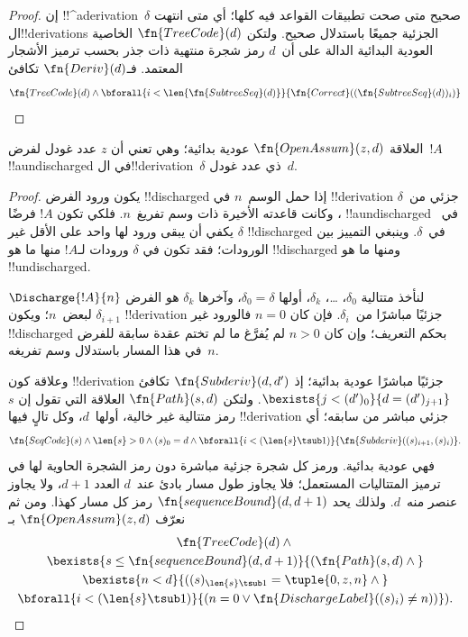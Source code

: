 \documentclass[../../../include/open-logic-section]{subfiles}
\begin{document}
\begin{proof}
  إن !!^a{derivation}~$\delta$ صحيح متى صحت
  تطبيقات القواعد فيه كلها؛ أي متى انتهت
  ال!!{derivation}s الجزئية جميعًا باستدلال
  صحيح. ولتكن $\fn{TreeCode}(d)$ الخاصية العودية البدائية الدالة
  على أن~$d$ رمز شجرة منتهية ذات جذر بحسب ترميز الأشجار المعتمد.
  فـ$\fn{Deriv}(d)$ تكافئ
  \[
  \fn{TreeCode}(d) \land
  \bforall{i<\len{\fn{SubtreeSeq}(d)}}{\fn{Correct}((\fn{SubtreeSeq}(d))_i)}
  \]
\end{proof}

\begin{prop}
   العلاقة $\fn{OpenAssum}(z,d)$ عودية بدائية؛
  وهي تعني أن $z$ عدد غودل لفرض~$!A$
  !!a{undischarged} في ال!!{derivation}~$\delta$
  ذي عدد غودل~$d$.
\end{prop}

\begin{proof}
  يكون ورود الفرض !!{discharged} إذا
  حمل الوسم~$n$ في !!{derivation}
  جزئي من~$\delta$، وكانت قاعدته
  الأخيرة ذات وسم تفريغ~$n$.
  فلكي تكون $!A$ فرضًا !!a{undischarged}
  في~$\delta$ يكفي أن يبقى ورود لها
  واحد على الأقل غير !!{discharged}
  في~$\delta$. وينبغي التمييز بين
  الورودات؛ فقد تكون في $\delta$
  ورودات لـ$!A$ منها ما هو
  !!{discharged} ومنها ما هو !!{undischarged}.

  لنأخذ متتالية $\delta_0$، \dots،
  $\delta_k$، أولها $\delta_0=\delta$،
  وآخرها $\delta_k$ هو الفرض
  $\Discharge{!A}{n}$ لبعض~$n$؛
  ويكون $\delta_{i+1}$ !!{derivation}
  جزئيًا مباشرًا من~$\delta_i$.
  فإن كان $n=0$ فالورود غير !!{discharged}
  بحكم التعريف؛ وإن كان $n>0$ لم يُفرَّغ
  ما لم تختم عقدة سابقة للفرض في هذا
  المسار باستدلال وسم تفريغه~$n$.

  وعلاقة كون !!{derivation} جزئيًا مباشرًا
  عودية بدائية؛ إذ
  $\fn{Subderiv}(d,d')$ تكافئ
  $\bexists{j<(d')_0}{d=(d')_{j+1}}$.
  ولتكن $\fn{Path}(s,d)$ العلاقة التي
  تقول إن $s$ رمز متتالية غير خالية،
  أولها~$d$، وكل تالٍ فيها !!{derivation}
  جزئي مباشر من سابقه؛ أي
  \[
    \fn{SeqCode}(s) \land \len{s}>0 \land (s)_0=d \land
    \bforall{i<(\len{s}\tsub 1)}{\fn{Subderiv}((s)_{i+1},(s)_i)}.
  \]
  فهي عودية بدائية. ورمز كل شجرة جزئية
  مباشرة دون رمز الشجرة الحاوية لها في
  ترميز المتتاليات المستعمل؛ فلا يجاوز
  طول مسار بادئ عند~$d$ العدد $d+1$،
  ولا يجاوز عنصر منه~$d$. ولذلك يحد
  $\fn{sequenceBound}(d,d+1)$ رمز كل
  مسار كهذا. ومن ثم نعرّف
  $\fn{OpenAssum}(z,d)$ بـ
  \begin{multline*}
    \fn{TreeCode}(d) \land {}\\
    \bexists{s\leq\fn{sequenceBound}(d,d+1)}{(\fn{Path}(s,d) \land {}} \\
    \bexists{n<d}{((s)_{\len{s} \tsub 1} = \tuple{0, z, n} \land {}}\\
      \bforall{i<(\len{s} \tsub 1)}{(n=0 \lor
      \fn{DischargeLabel}((s)_i) \neq n))}).
  \end{multline*}
\end{proof}
\end{document}
